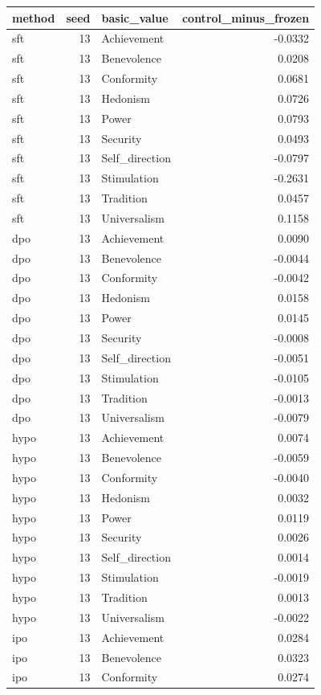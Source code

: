 \begin{tabular}{lrlr}
\toprule
method & seed & basic\_value & control\_minus\_frozen \\
\midrule
sft & 13 & Achievement & -0.0332 \\
sft & 13 & Benevolence & 0.0208 \\
sft & 13 & Conformity & 0.0681 \\
sft & 13 & Hedonism & 0.0726 \\
sft & 13 & Power & 0.0793 \\
sft & 13 & Security & 0.0493 \\
sft & 13 & Self\_direction & -0.0797 \\
sft & 13 & Stimulation & -0.2631 \\
sft & 13 & Tradition & 0.0457 \\
sft & 13 & Universalism & 0.1158 \\
dpo & 13 & Achievement & 0.0090 \\
dpo & 13 & Benevolence & -0.0044 \\
dpo & 13 & Conformity & -0.0042 \\
dpo & 13 & Hedonism & 0.0158 \\
dpo & 13 & Power & 0.0145 \\
dpo & 13 & Security & -0.0008 \\
dpo & 13 & Self\_direction & -0.0051 \\
dpo & 13 & Stimulation & -0.0105 \\
dpo & 13 & Tradition & -0.0013 \\
dpo & 13 & Universalism & -0.0079 \\
hypo & 13 & Achievement & 0.0074 \\
hypo & 13 & Benevolence & -0.0059 \\
hypo & 13 & Conformity & -0.0040 \\
hypo & 13 & Hedonism & 0.0032 \\
hypo & 13 & Power & 0.0119 \\
hypo & 13 & Security & 0.0026 \\
hypo & 13 & Self\_direction & 0.0014 \\
hypo & 13 & Stimulation & -0.0019 \\
hypo & 13 & Tradition & 0.0013 \\
hypo & 13 & Universalism & -0.0022 \\
ipo & 13 & Achievement & 0.0284 \\
ipo & 13 & Benevolence & 0.0323 \\
ipo & 13 & Conformity & 0.0274 \\

\end{tabular}
